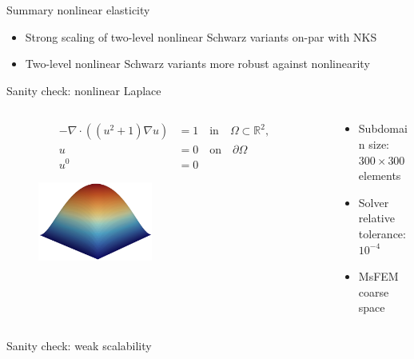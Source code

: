  \begin{frame}[noframenumbering]{Summary nonlinear elasticity}
   \begin{itemize}
     \item Strong scaling of two-level nonlinear Schwarz variants on-par with NKS
     \item Two-level nonlinear Schwarz variants more robust against nonlinearity
   \end{itemize}
 \end{frame}
\begin{frame}[noframenumbering]{Sanity check: nonlinear Laplace}
    \begin{columns}
        \begin{column}{0.47\textwidth}
                \begin{align*}
                    -\nabla\cdot((u^2+1)\nabla u)&=1\quad \text{in}\quad \Omega\subset\mathbb{R}^2,\\
                    u &= 0\quad\text{on}\quad\partial\Omega\\
                    u^0 &= 0
                \end{align*}
                \begin{figure}
                    \centering
                    \includegraphics[width=0.45\textwidth]{images/laplace}
                \end{figure}
        \end{column}
        \begin{column}{0.53\textwidth}
               \begin{itemize}
                \setlength{\itemsep}{10pt}
                \item Subdomain size: $300\times300$ elements
                \item Solver relative tolerance: $10^{-4}$
                \item MsFEM coarse space
               \end{itemize} 
        \end{column}
    \end{columns}
 \end{frame}
 
 \begin{frame}[noframenumbering]{Sanity check: weak scalability}
  \begin{figure}
      \centering
      
  \end{figure}
 \end{frame}
